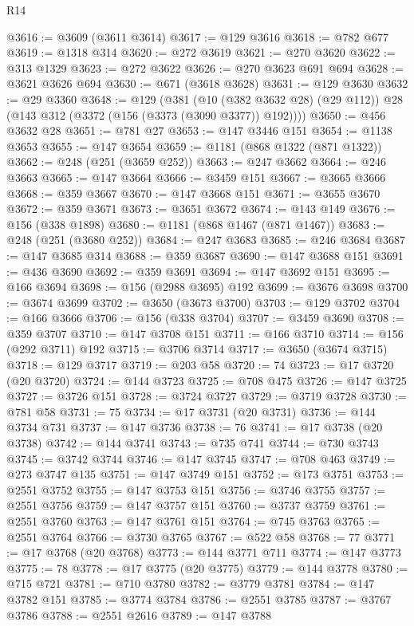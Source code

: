 \begin{lexlean}{R14}
\begin{coremodule}
@3616 := @3609 (@3611 @3614)
@3617 := @129 @3616
@3618 := @782 @677
@3619 := @1318 @314
@3620 := @272 @3619
@3621 := @270 @3620
@3622 := @313 @1329
@3623 := @272 @3622
@3626 := @270 @3623 @691 @694
@3628 := @3621 @3626 @694
@3630 := @671 (@3618 @3628)
@3631 := @129 @3630
@3632 := @29 @3360
@3648 := @129
    (@381
      (@10 (@382 @3632 @28) (@29 @112))
      @28
      (@143 @312 (@3372 (@156 (@3373 (@3090 @3377)) @192))))
@3650 := @456 @3632 @28
@3651 := @781 @27
@3653 := @147 @3446 @151
@3654 := @1138 @3653
@3655 := @147 @3654
@3659 := @1181 (@868 @1322 (@871 @1322))
@3662 := @248 (@251 (@3659 @252))
@3663 := @247 @3662
@3664 := @246 @3663
@3665 := @147 @3664
@3666 := @3459 @151
@3667 := @3665 @3666
@3668 := @359 @3667
@3670 := @147 @3668 @151
@3671 := @3655 @3670
@3672 := @359 @3671
@3673 := @3651 @3672
@3674 := @143 @149
@3676 := @156 (@338 @1898)
@3680 := @1181 (@868 @1467 (@871 @1467))
@3683 := @248 (@251 (@3680 @252))
@3684 := @247 @3683
@3685 := @246 @3684
@3687 := @147 @3685 @314
@3688 := @359 @3687
@3690 := @147 @3688 @151
@3691 := @436 @3690
@3692 := @359 @3691
@3694 := @147 @3692 @151
@3695 := @166 @3694
@3698 := @156 (@2988 @3695) @192
@3699 := @3676 @3698
@3700 := @3674 @3699
@3702 := @3650 (@3673 @3700)
@3703 := @129 @3702
@3704 := @166 @3666
@3706 := @156 (@338 @3704)
@3707 := @3459 @3690
@3708 := @359 @3707
@3710 := @147 @3708 @151
@3711 := @166 @3710
@3714 := @156 (@292 @3711) @192
@3715 := @3706 @3714
@3717 := @3650 (@3674 @3715)
@3718 := @129 @3717
@3719 := @203 @58
@3720 := 74
@3723 := @17 @3720 (@20 @3720)
@3724 := @144 @3723
@3725 := @708 @475
@3726 := @147 @3725
@3727 := @3726 @151
@3728 := @3724 @3727
@3729 := @3719 @3728
@3730 := @781 @58
@3731 := 75
@3734 := @17 @3731 (@20 @3731)
@3736 := @144 @3734 @731
@3737 := @147 @3736
@3738 := 76
@3741 := @17 @3738 (@20 @3738)
@3742 := @144 @3741
@3743 := @735 @741
@3744 := @730 @3743
@3745 := @3742 @3744
@3746 := @147 @3745
@3747 := @708 @463
@3749 := @273 @3747 @135
@3751 := @147 @3749 @151
@3752 := @173 @3751
@3753 := @2551 @3752
@3755 := @147 @3753 @151
@3756 := @3746 @3755
@3757 := @2551 @3756
@3759 := @147 @3757 @151
@3760 := @3737 @3759
@3761 := @2551 @3760
@3763 := @147 @3761 @151
@3764 := @745 @3763
@3765 := @2551 @3764
@3766 := @3730 @3765
@3767 := @522 @58
@3768 := 77
@3771 := @17 @3768 (@20 @3768)
@3773 := @144 @3771 @711
@3774 := @147 @3773
@3775 := 78
@3778 := @17 @3775 (@20 @3775)
@3779 := @144 @3778
@3780 := @715 @721
@3781 := @710 @3780
@3782 := @3779 @3781
@3784 := @147 @3782 @151
@3785 := @3774 @3784
@3786 := @2551 @3785
@3787 := @3767 @3786
@3788 := @2551 @2616
@3789 := @147 @3788

\end{coremodule}
\end{lexlean}
